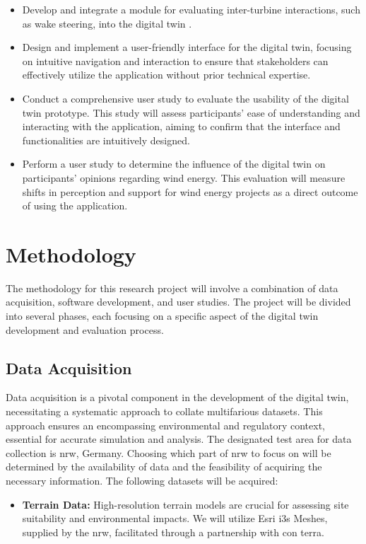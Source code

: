 \documentclass[11pt, titlepage, a4paper]{scrartcl}
\begin{document}
\begin{linenumbers}
\begin{itemize}[label={--}]
    \item Develop and integrate a module for evaluating inter-turbine interactions, such as wake steering, into the digital twin \cite{howlandWindFarmPower2019a}.
    \item  Design and implement a user-friendly interface for the digital twin, focusing on intuitive navigation and interaction to ensure that stakeholders can effectively utilize the application without prior technical expertise.
    \item Conduct a comprehensive user study to evaluate the usability of the digital twin prototype. This study will assess participants' ease of understanding and interacting with the application, aiming to confirm that the interface and functionalities are intuitively designed.
    \item Perform a user study to determine the influence of the digital twin on participants' opinions regarding wind energy. This evaluation will measure shifts in perception and support for wind energy projects as a direct outcome of using the application.
\end{itemize}


\section{Methodology}
The methodology for this research project will involve a combination of data acquisition, software development, and user studies. The project will be divided into several phases, each focusing on a specific aspect of the digital twin development and evaluation process.

\subsection{Data Acquisition}
Data acquisition is a pivotal component in the development of the digital twin, necessitating a systematic approach to collate multifarious datasets. This approach ensures an encompassing environmental and regulatory context, essential for accurate simulation and analysis. The designated test area for data collection is \gls{nrw}, Germany. Choosing which part of \gls{nrw} to focus on will be determined by the availability of data and the feasibility of acquiring the necessary information.
The following datasets will be acquired:

\begin{itemize}
    \item \textbf{Terrain Data:} High-resolution terrain models are crucial for assessing site suitability and environmental impacts. We will utilize Esri \gls{i3s} Meshes, supplied by the \gls{nrw}, facilitated through a partnership with con terra.


\end{itemize}
\end{linenumbers}
\end{document}
